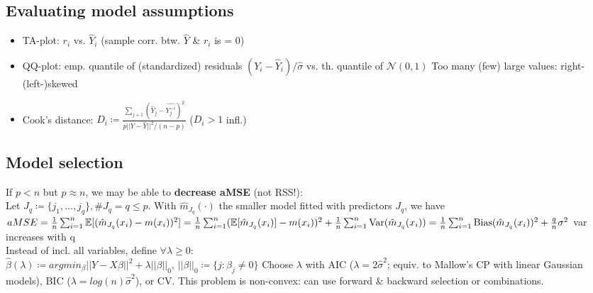 \subsection*{Evaluating model assumptions}
\begin{itemize}
    \item TA-plot: $r_i$ vs. $\hat{Y}_i$ (sample corr. btw. $\hat{Y}$ \& $r_i$ is = 0) 
    \item QQ-plot: emp. quantile of (standardized) residuals $(Y_i -\hat{Y}_i)/\hat{\sigma}$ vs. th. quantile of  $\mathcal{N}(0,1)$ \textrightarrow Too many (few) large values: right-(left-)skewed
    \item Cook's distance: $D_i \coloneqq \frac{\sum_{j+1}(\hat{Y}_j-\widehat{Y_j^{-i}})^2}{p||Y-\hat{Y}||^2/(n-p)}$ ($D_i>1$ infl.)
\end{itemize}
\subsection*{Model selection}
If $p<n$ but $p\approx n$, we may be able to \textbf{decrease aMSE} (not RSS!): \\ 
Let $J_q \coloneqq \{j_1,...,j_q\}, \#J_q=q\leq p$. With $\hat{m}_{J_q}(\cdot)$ the smaller model fitted with predictors $J_q$, we have $aMSE = \frac{1}{n}\sum_{i=1}^n\mathbb{E}[(\hat{m}_{J_q}(x_i)-m(x_i))^2] \\ 
=\frac{1}{n}\sum_{i=1}^n(\mathbb{E}[\hat{m}_{J_q}(x_i)]-m(x_i))^2 + \frac{1}{n}\sum_{i=1}^n\text{Var}(\hat{m}_{J_q}(x_i)) \\ 
=\frac{1}{n}\sum_{i=1}^n\text{Bias}(\hat{m}_{J_q}(x_i))^2 + \frac{q}{n}\sigma^2$ \textrightarrow var increases with q \\
Instead of incl. all variables, define $\forall \lambda \geq 0$: \\
$\hat{\beta}(\lambda) \coloneqq argmin_{\beta}||Y-X\beta||^2+\lambda||\beta||_0$, $||\beta||_0 \coloneqq \{j:\beta_j\neq0\}$
Choose $\lambda$ with AIC ($\lambda=2\hat{\sigma}^2$; equiv. to Mallow's CP with linear Gaussian models), BIC ($\lambda=log(n)\hat{\sigma}^2$), or CV. 
This problem is non-convex: can use forward \& backward selection or combinations. 